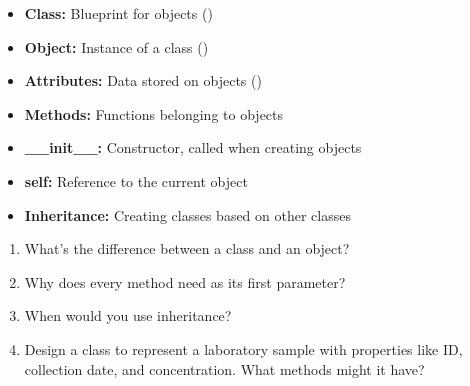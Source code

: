 \begin{itemize}
    \item \textbf{Class:} Blueprint for objects ()
    \item \textbf{Object:} Instance of a class ()
    \item \textbf{Attributes:} Data stored on objects ()
    \item \textbf{Methods:} Functions belonging to objects
    \item \textbf{\_\_init\_\_:} Constructor, called when creating objects
    \item \textbf{self:} Reference to the current object
    \item \textbf{Inheritance:} Creating classes based on other classes
\end{itemize}

\begin{ponder}
\begin{enumerate}
    \item What's the difference between a class and an object?
    \item Why does every method need  as its first parameter?
    \item When would you use inheritance?
    \item Design a class to represent a laboratory sample with properties like ID, collection date, and concentration. What methods might it have?
\end{enumerate}
\end{ponder}
